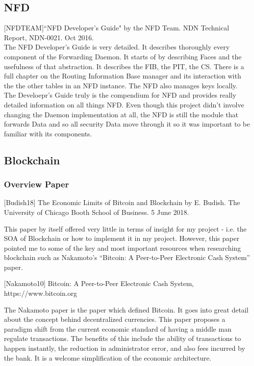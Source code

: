 \subsection{NFD}
[NFDTEAM]``NFD Developer's Guide" by the NFD Team. NDN Technical Report, NDN-0021. Oct 2016.\\

The NFD Developer's Guide is very detailed. It describes thoroughly every component of the Forwarding Daemon. It starts of by describing Faces and the usefulness of that abstraction. It describes the FIB, the PIT, the CS. There is a full chapter on the Routing Information Base manager and its interaction with the the other tables in an NFD instance. The NFD also manages keys locally. The Develoepr's Guide truly is the compendium for NFD and provides really detailed information on all things NFD. Even though this project didn't involve changing the Daemon implementation at all, the NFD is still the module that forwards Data and so all security Data move through it so it was important to be familiar with its components.
\subsection{Blockchain}
\subsubsection{Overview Paper}
[Budish18]  The Economic Limits of Bitcoin and Blockchain by E. Budish. The University of Chicago Booth School of Business. 5 June 2018.


This paper by itself offered very little in terms of insight for my project - i.e. the SOA of Blockchain or how to implement it in my project. However, this paper pointed me to some of the key and most important resources when researching blockchain such as Nakamoto’s “Bitcoin: A Peer-to-Peer Electronic Cash System” paper. 

[Nakamoto10] Bitcoin: A Peer-to-Peer Electronic Cash System, https://www.bitcoin.org

The Nakamoto paper is the paper which defined Bitcoin. It goes into great detail about the concept behind decentralized currencies. This paper proposes a paradigm shift from the current economic standard of having a middle man regulate transactions. The benefits of this include the ability of transactions to happen instantly, the reduction in administrator error, and also fees incurred by the bank. It is a welcome simplification of the economic architecture. 

